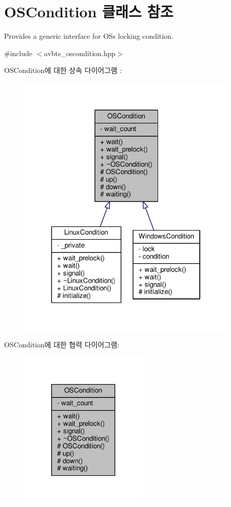 \hypertarget{class_o_s_condition}{}\section{O\+S\+Condition 클래스 참조}
\label{class_o_s_condition}


Provides a generic interface for OS\textquotesingle{}s locking condition.  




{\ttfamily \#include $<$avbts\+\_\+oscondition.\+hpp$>$}



O\+S\+Condition에 대한 상속 다이어그램 \+: 
\nopagebreak
\begin{figure}[H]
\begin{center}
\leavevmode
\includegraphics[width=298pt]{class_o_s_condition__inherit__graph}
\end{center}
\end{figure}


O\+S\+Condition에 대한 협력 다이어그램\+:
\nopagebreak
\begin{figure}[H]
\begin{center}
\leavevmode
\includegraphics[width=173pt]{class_o_s_condition__coll__graph}
\end{center}
\end{figure}
